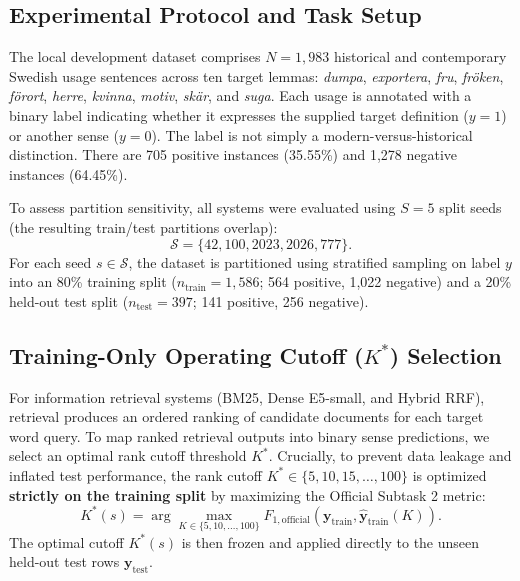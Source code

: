 \subsection{Experimental Protocol and Task Setup}
The local development dataset comprises $N = 1,983$ historical and contemporary Swedish usage sentences across ten target lemmas: \textit{dumpa}, \textit{exportera}, \textit{fru}, \textit{fröken}, \textit{förort}, \textit{herre}, \textit{kvinna}, \textit{motiv}, \textit{skär}, and \textit{suga}. Each usage is annotated with a binary label indicating whether it expresses the supplied target definition ($y=1$) or another sense ($y=0$). The label is not simply a modern-versus-historical distinction. There are 705 positive instances (35.55\%) and 1,278 negative instances (64.45\%).

To assess partition sensitivity, all systems were evaluated using $S = 5$ split seeds (the resulting train/test partitions overlap):
\begin{equation}
\mathcal{S} = \{42, 100, 2023, 2026, 777\}.
\end{equation}
For each seed $s \in \mathcal{S}$, the dataset is partitioned using stratified sampling on label $y$ into an 80\% training split ($n_{\text{train}} = 1,586$; 564 positive, 1,022 negative) and a 20\% held-out test split ($n_{\text{test}} = 397$; 141 positive, 256 negative).

\subsection{Training-Only Operating Cutoff ($K^*$) Selection}
For information retrieval systems (BM25, Dense E5-small, and Hybrid RRF), retrieval produces an ordered ranking of candidate documents for each target word query. To map ranked retrieval outputs into binary sense predictions, we select an optimal rank cutoff threshold $K^*$. Crucially, to prevent data leakage and inflated test performance, the rank cutoff $K^* \in \{5, 10, 15, \dots, 100\}$ is optimized \textbf{strictly on the training split} by maximizing the Official Subtask 2 metric:
\begin{equation}
K^*(s) = \arg\max_{K \in \{5, 10, \dots, 100\}} F_{1,\text{official}}\left(\mathbf{y}_{\text{train}}, \hat{\mathbf{y}}_{\text{train}}(K)\right).
\end{equation}
The optimal cutoff $K^*(s)$ is then frozen and applied directly to the unseen held-out test rows $\mathbf{y}_{\text{test}}$.

